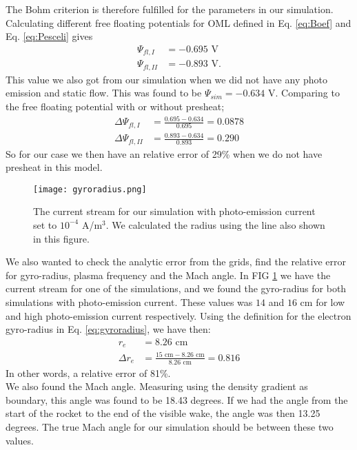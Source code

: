 \documentclass[aip, 
rsi, 
amsmath,
amssymb,
longbibliography,
preprint]{revtex4-1}
\begin{document}
The Bohm criterion is therefore fulfilled for the parameters in our simulation. Calculating different free floating potentials for OML defined in Eq. \ref{eq:Boef} and Eq. \ref{eq:Pesceli} gives
\begin{align*}
\Psi_{fl,I} &= -0.695 \, \, \text{V}\\
\Psi_{fl,II}&= -0.893 \, \, \text{V}.
\end{align*}
This value we also got from our simulation when we did not have any photo emission and static flow. This was found to be $\Psi_{sim} = -0.634$ V. Comparing to the free floating potential with or without presheat;
\begin{align*}
\Delta \Psi_{fl,I} &= \frac{0.695-0.634}{0.695} = 0.0878\\
\Delta \Psi_{fl,II} &= \frac{0.893-0.634}{0.893} = 0.290
\end{align*}
So for our case we then have an relative error of 29\% when we do not have presheat in this model.\\

\begin{figure}
\texttt{[image: gyroradius.png]}
\caption{The current stream for our simulation with photo-emission current set to $10^{-4}$ A/m$^3$. We calculated the radius using the line also shown in this figure.\label{fig:gyroradius}}
\end{figure}

We also wanted to check the analytic error from the grids, find the relative error for gyro-radius, plasma frequency and the Mach angle. In FIG \ref{fig:gyroradius} we have the current stream for one of the simulations, and we found the gyro-radius for both simulations with photo-emission current. These values was $14$ and $16$ cm for low and high photo-emission current respectively. Using the definition for the electron gyro-radius in Eq. \ref{eq:gyroradius}, we have then:
\begin{align*}
r_e &= 8.26 \, \, \text{cm}\\
\Delta r_e &= \frac{15 \, \, \text{cm}- 8.26 \, \, \text{cm}}{8.26 \, \, \text{cm}} = 0.816
\end{align*}
In other words, a relative error of 81\%.\\

We also found the Mach angle. Measuring using the density gradient as boundary, this angle was found to be 18.43 degrees. If we had the angle from the start of the rocket to the end of the visible wake, the angle was then 13.25 degrees. The true Mach angle for our simulation should be between these two values.\\
\end{document}
